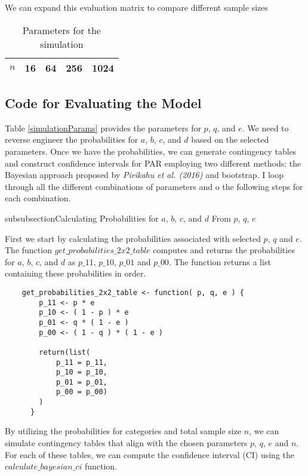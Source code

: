 We can expand this evaluation matrix to compare different sample sizes

\begin{table}[h!] \label{sample-count-parameters}
    \centering
    \caption{Parameters for the simulation}
    \begin{tabular}{|c|c|c|c|c|}
    \hline
    $n$ & 16 & 64 & 256 & 1024 \\ \hline
    \end{tabular}
\end{table}
\subsection{Code for Evaluating the Model}

Table \ref{simulationParams} provides the parameters for $p$, $q$, and $e$. We need to reverse engineer the probabilities for $a$, $b$, $c$, and $d$ based on the selected parameters. Once we have the probabilities, we can generate contingency tables and construct confidence intervals for PAR employing two different methods: the Bayesian approach proposed by \textit{Pirikahu et al. (2016)} and bootstrap. I loop through all the different combinations of parameters and o the following steps for each combination.

\*subsubsection{Calculating Probabilities for $a$, $b$, $c$, and $d$ From $p$, $q$, $e$}

First we start by calculating the probabilities associated with selected $p$, $q$ and $e$. The function $get\_probabilities\_2x2\_table$ computes and returns the probabilities for $a$, $b$, $c$, and $d$ as $p\_11$, $p\_10$, $p\_01$ and $p\_00$. The function returns a list containing these probabilities in order.

\begin{lstlisting}
    get_probabilities_2x2_table <- function( p, q, e ) {
        p_11 <- p * e
        p_10 <- ( 1 - p ) * e
        p_01 <- q * ( 1 - e )
        p_00 <- ( 1 - q ) * ( 1 - e )
      
        return(list(
            p_11 = p_11,
            p_10 = p_10,
            p_01 = p_01,
            p_00 = p_00)
        )
      }
\end{lstlisting}

By utilizing the probabilities for categories and total sample size $n$, we can simulate contingency tables that align with the chosen parameters $p$, $q$, $e$ and $n$. For each of these tables, we can compute the confidence interval (CI) using the $calculate\_bayesian\_ci$ function. 


